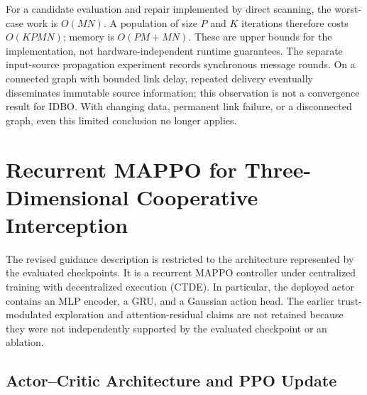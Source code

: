 \documentclass[lettersize,journal]{IEEEtran}
\begin{document}
{For a candidate evaluation and repair implemented by direct scanning, the
worst-case work is \(O(MN)\). A population of size \(P\) and \(K\) iterations
therefore costs \(O(KPMN)\); memory is \(O(PM+MN)\). These are upper bounds for
the implementation, not hardware-independent runtime guarantees. The separate
input-source propagation experiment records synchronous message rounds. On a
connected graph with bounded link delay, repeated delivery eventually
disseminates immutable source information; this observation is not a convergence
result for IDBO. With changing data, permanent link failure, or a disconnected
graph, even this limited conclusion no longer applies.

\section{Recurrent MAPPO for Three-Dimensional Cooperative Interception}
\label{sec:cooperative_algorithm}

The revised guidance description is restricted to the architecture represented by
the evaluated checkpoints. It is a recurrent MAPPO controller under centralized
training with decentralized execution (CTDE). In particular, the deployed actor
contains an MLP encoder, a GRU, and a Gaussian action head. The earlier
trust-modulated exploration and attention-residual claims are not retained because
they were not independently supported by the evaluated checkpoint or an ablation.

\subsection{Actor--Critic Architecture and PPO Update}

}
\end{document}
